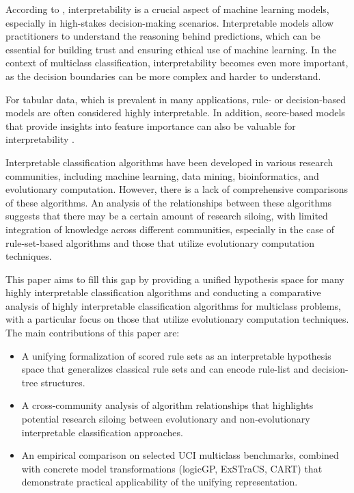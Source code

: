 \documentclass[a4paper,twoside]{article}
\begin{document}

According to \citet{RudinEtAlSurvey2022}, interpretability is a crucial aspect of machine learning models, especially in high-stakes decision-making scenarios. Interpretable models allow practitioners to understand the reasoning behind predictions, which can be essential for building trust and ensuring ethical use of machine learning. In the context of multiclass classification, interpretability becomes even more important, as the decision boundaries can be more complex and harder to understand.

For tabular data, which is prevalent in many applications, rule- or decision-based models are often considered highly interpretable. In addition, score-based models that provide insights into feature importance can also be valuable for interpretability \citep{RudinEtAlSurvey2022}. 

Interpretable classification algorithms have been developed in various research communities, including machine learning, data mining, bioinformatics, and evolutionary computation. However, there is a lack of comprehensive comparisons of these algorithms. An analysis of the relationships between these algorithms suggests that there may be a certain amount of research siloing, with limited integration of knowledge across different communities, especially in the case of rule-set-based algorithms and those that utilize evolutionary computation techniques.

This paper aims to fill this gap by providing a unified hypothesis space for many highly interpretable classification algorithms and conducting a comparative analysis of highly interpretable classification algorithms for multiclass problems, with a particular focus on those that utilize evolutionary computation techniques. The main contributions of this paper are:
\begin{itemize}
  \item A unifying formalization of scored rule sets as an interpretable hypothesis space that generalizes classical rule sets and can encode rule-list and decision-tree structures.
  \item A cross-community analysis of algorithm relationships that highlights potential research siloing between evolutionary and non-evolutionary interpretable classification approaches.
  \item An empirical comparison on selected UCI multiclass benchmarks, combined with concrete model transformations (logicGP, ExSTraCS, CART) that demonstrate practical applicability of the unifying representation.
\end{itemize}
\end{document}
